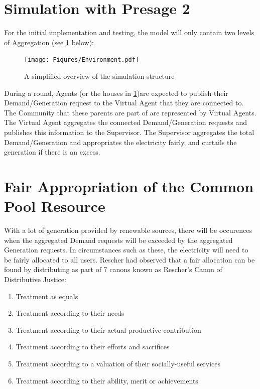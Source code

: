 \section*{Simulation with Presage 2}
For the initial implementation and testing, the model will only contain two levels of Aggregation (see \ref{fig:SimEnv} below):

\begin{figure}[h!]
	\centering
	\texttt{[image: Figures/Environment.pdf]}
	\caption{A simplified overview of the simulation structure}
	\label{fig:SimEnv}
\end{figure}

\clearpage
During a round, Agents (or the houses in \ref{fig:SimEnv})are expected to publish their Demand/Generation request to the Virtual Agent that they are connected to. The Community that these parents are part of are represented by Virtual Agents. The Virtual Agent aggregates the connected Demand/Generation requests and publishes this information to the Supervisor. The Supervisor aggregates the total Demand/Generation and appropriates the electricity fairly, and curtails the generation if there is an excess.

\section*{Fair Appropriation of the Common Pool Resource}
With a lot of generation provided by renewable sources, there will be occurences when the aggregated Demand requests will be exceeded by the aggregated Generation requests. In circumstances such as these, the electricity will need to be fairly allocated to all users. Rescher had observed that a fair allocation can be found by distributing as part of 7 canons known as Rescher's Canon of Distributive Justice:

\begin{enumerate} \itemsep1pt \parskip0pt 
	\item Treatment as equals
	\item Treatment according to their needs
	\item Treatment according to their actual productive contribution
	\item Treatment according to their efforts and sacrifices
	\item Treatment according to a valuation of their socially-useful services
	\item Treatment according to their ability, merit or achievements
\end{enumerate}